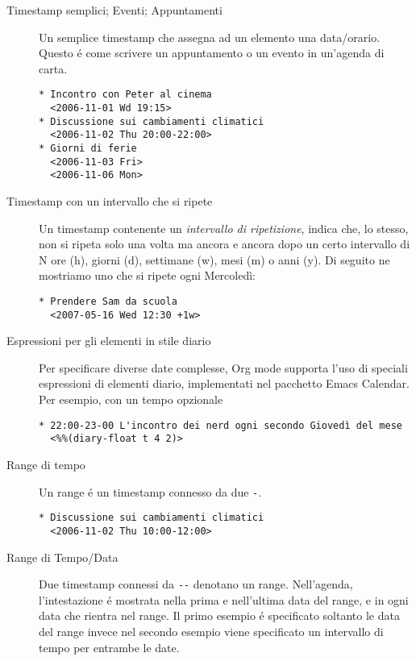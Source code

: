 \documentclass[11pt]{article}
\begin{document}
\begin{description}
\item[{Timestamp semplici; Eventi; Appuntamenti}] Un semplice timestamp che assegna ad un elemento una
data/orario. Questo é come scrivere un appuntamento o un evento in
un'agenda di carta.

\begin{verbatim}
* Incontro con Peter al cinema
  <2006-11-01 Wd 19:15>
* Discussione sui cambiamenti climatici
  <2006-11-02 Thu 20:00-22:00>
* Giorni di ferie
  <2006-11-03 Fri>
  <2006-11-06 Mon>
\end{verbatim}

\item[{Timestamp con un intervallo che si ripete}] Un timestamp contenente un \emph{intervallo di ripetizione}, indica
che, lo stesso, non si ripeta solo una volta ma ancora e ancora
dopo un certo intervallo di N ore (h), giorni (d), settimane (w),
mesi (m) o anni (y). Di seguito ne mostriamo uno che si ripete ogni
Mercoledì:

\begin{verbatim}
* Prendere Sam da scuola
  <2007-05-16 Wed 12:30 +1w>
\end{verbatim}

\item[{Espressioni per gli elementi in stile diario}] Per specificare diverse date complesse, Org mode supporta l'uso di
speciali espressioni di elementi diario, implementati nel pacchetto
Emacs Calendar. Per esempio, con un tempo opzionale

\begin{verbatim}
* 22:00-23-00 L'incontro dei nerd ogni secondo Giovedì del mese
  <%%(diary-float t 4 2)>
\end{verbatim}

\item[{Range di tempo}] Un range é un timestamp connesso da due \texttt{-}.

\begin{verbatim}
* Discussione sui cambiamenti climatici
  <2006-11-02 Thu 10:00-12:00>
\end{verbatim}

\item[{Range di Tempo/Data}] Due timestamp connessi da \texttt{-{}-{}} denotano un range. Nell'agenda,
l'intestazione é mostrata nella prima e nell'ultima data del range,
e in ogni data che rientra nel range. Il primo esempio é specificato
soltanto le data del range invece nel secondo esempio viene
specificato un intervallo di tempo per entrambe le date.


\end{description}
\end{document}
